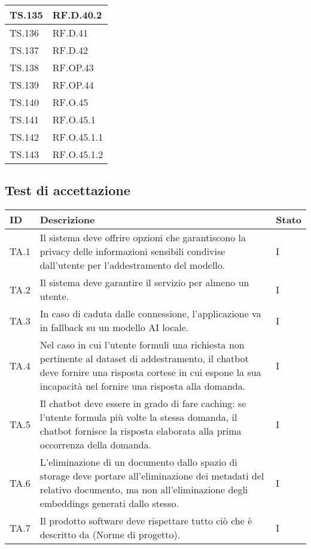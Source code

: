{{{{{{{{{\begin{tabularx}{\textwidth}{p{}|X}
    \hline
    TS.135 & RF.D.40.2 \\
    \hline
    TS.136 & RF.D.41 \\
    \hline
    TS.137 & RF.D.42 \\
    \hline
    TS.138 & RF.OP.43 \\
    \hline
    TS.139 & RF.OP.44 \\
    \hline
    TS.140 & RF.O.45 \\
    \hline
    TS.141 & RF.O.45.1 \\
    \hline
    TS.142 & RF.O.45.1.1 \\
    \hline
    TS.143 & RF.O.45.1.2 \\
    \end{tabularx}
    }


\subsection{Test di accettazione}
    {\renewcommand{\arraystretch}{1.5}
    \begin{tabularx}{\textwidth}{p{}|p{}|X}
    \textbf{ID} & \textbf{Descrizione} & \textbf{Stato}  \\
    \hline
    TA.1 & Il sistema deve offrire opzioni che garantiscono la privacy delle informazioni sensibili condivise dall’utente per l’addestramento del modello. & I \\
    \hline
    TA.2 & Il sistema deve garantire il servizio per almeno un utente. & I \\
    \hline
    TA.3 & In caso di caduta dalle connessione, l’applicazione va in fallback su un modello AI locale. & I \\
    \hline
    TA.4 & Nel caso in cui l’utente formuli una richiesta non pertinente al dataset di addestramento, il chatbot deve fornire una risposta cortese in cui espone la sua incapacità nel fornire una risposta alla domanda. & I \\
    \hline
    TA.5 & Il chatbot deve essere in grado di fare caching: se l’utente formula più volte la stessa domanda, il chatbot fornisce la risposta elaborata alla prima occorrenza della domanda. & I \\
    \hline
    TA.6 & L’eliminazione di un documento dallo spazio di storage deve portare all’eliminazione dei metadati del relativo documento, ma non all’eliminazione degli embeddings generati dallo stesso. & I \\
    \hline
    TA.7 & Il prodotto software deve rispettare tutto ciò che è descritto da (Norme di progetto). & I \\

\end{tabularx}}}}}}}}}}
